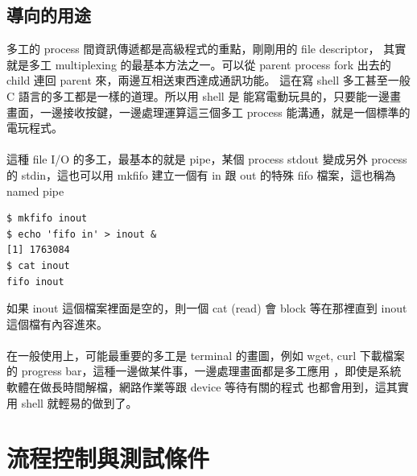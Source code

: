     \subsection{導向的用途}
    多工的 process 間資訊傳遞都是高級程式的重點，剛剛用的 file descriptor，
    其實就是多工 multiplexing 的最基本方法之一。可以從 parent process
    fork 出去的 child 連回 parent 來，兩邊互相送東西達成通訊功能。
    這在寫 shell 多工甚至一般 C 語言的多工都是一樣的道理。所以用 shell 是
    能寫電動玩具的，只要能一邊畫畫面，一邊接收按鍵，一邊處理運算這三個多工
    process 能溝通，就是一個標準的電玩程式。
    \\\\
    這種 file I/O 的多工，最基本的就是 pipe，某個 process stdout 變成另外
    process 的 stdin，這也可以用 mkfifo 建立一個有 in 跟 out 的特殊 fifo
    檔案，這也稱為 named pipe
    \begin{verbatim}
$ mkfifo inout
$ echo 'fifo in' > inout &
[1] 1763084
$ cat inout
fifo inout
    \end{verbatim}
    如果 inout 這個檔案裡面是空的，則一個 cat (read) 會 block 等在那裡直到
    inout 這個檔有內容進來。
    \\\\
    在一般使用上，可能最重要的多工是 terminal 的畫圖，例如 wget, curl
    下載檔案的 progress bar，這種一邊做某件事，一邊處理畫面都是多工應用
    ，即使是系統軟體在做長時間解檔，網路作業等跟 device 等待有關的程式
    也都會用到，這其實用 shell 就輕易的做到了。

    \section{流程控制與測試條件}
